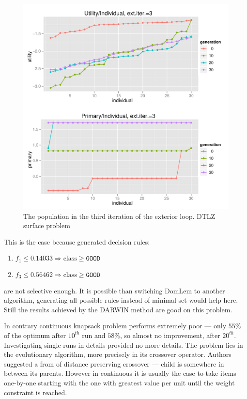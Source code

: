 \begin{figure}
  \centering
  \includegraphics[width=1.0\textwidth]{exp/nouncert/c3_surface_utilind_03}
  \caption{The population in the third iteration of the exterior loop. DTLZ
    surface problem}
  \label{c3_surface_utilind_03}
\end{figure}

This is the case because generated decision rules:
\begin{enumerate}
\item $f_1 \le 0.14033 \Rightarrow \text{class} \ge \texttt{GOOD}$
\item $f_3 \le 0.56462 \Rightarrow \text{class} \ge \texttt{GOOD}$
\end{enumerate}
are not selective enough. It is possible than switching DomLem to another
algorithm, generating all possible rules instead of minimal set would help
here. Still the results achieved by the DARWIN method are good on this
problem.

In contrary continuous knapsack problem performs extremely poor --- only
$55\%$ of the optimum after $10^{th}$ run and $58\%$, so almost no
improvement, after $20^{th}$. Investigating single runs in details provided no
more details. The problem lies in the evolutionary algorithm, more precisely
in its crossover operator. Authors suggested a from of distance preserving
crossover --- child is somewhere in between its parents. However in continuous
it is usually the case to take items one-by-one starting with the one with
greatest value per unit until the weight constraint is reached.

